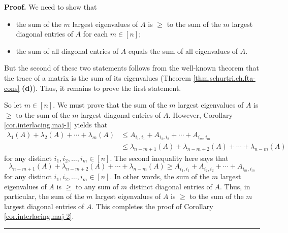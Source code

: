 \documentclass[numbers=enddot,12pt,final,onecolumn,notitlepage]{scrartcl}%
\numberwithin{exer}{subsection}
\theoremstyle{definition}
\newenvironment{proof}[1][Proof]{\noindent\textbf{#1.} }{\ \rule{0.5em}{0.5em}}
\begin{document}
\begin{proof}
We need to show that

\begin{itemize}
\item the sum of the $m$ largest eigenvalues of $A$ is $\geq$ to the sum of
the $m$ largest diagonal entries of $A$ for each $m\in\left[  n\right]  $;

\item the sum of all diagonal entries of $A$ equals the sum of all eigenvalues
of $A$.
\end{itemize}

But the second of these two statements follows from the well-known theorem
that the trace of a matrix is the sum of its eigenvalues (Theorem
\ref{thm.schurtri.ch.fta-cons} \textbf{(d)}). Thus, it remains to prove the
first statement.

So let $m\in\left[  n\right]  $. We must prove that the sum of the $m$ largest
eigenvalues of $A$ is $\geq$ to the sum of the $m$ largest diagonal entries of
$A$. However, Corollary \ref{cor.interlacing.maj-1} yields that%
\begin{align*}
\lambda_{1}\left(  A\right)  +\lambda_{2}\left(  A\right)  +\cdots+\lambda
_{m}\left(  A\right)   &  \leq A_{i_{1},i_{1}}+A_{i_{2},i_{2}}+\cdots
+A_{i_{m},i_{m}}\\
&  \leq\lambda_{n-m+1}\left(  A\right)  +\lambda_{n-m+2}\left(  A\right)
+\cdots+\lambda_{n-m}\left(  A\right)
\end{align*}
for any distinct $i_{1},i_{2},\ldots,i_{m}\in\left[  n\right]  $. The second
inequality here says that%
\[
\lambda_{n-m+1}\left(  A\right)  +\lambda_{n-m+2}\left(  A\right)
+\cdots+\lambda_{n-m}\left(  A\right)  \geq A_{i_{1},i_{1}}+A_{i_{2},i_{2}%
}+\cdots+A_{i_{m},i_{m}}%
\]
for any distinct $i_{1},i_{2},\ldots,i_{m}\in\left[  n\right]  $. In other
words, the sum of the $m$ largest eigenvalues of $A$ is $\geq$ to any sum of
$m$ distinct diagonal entries of $A$. Thus, in particular, the sum of the $m$
largest eigenvalues of $A$ is $\geq$ to the sum of the $m$ largest diagonal
entries of $A$. This completes the proof of Corollary
\ref{cor.interlacing.maj-2}.
\end{proof}
\end{document}
